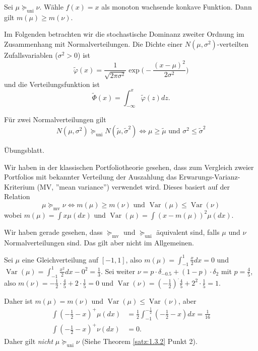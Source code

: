 \documentclass[a4paper,twoside,DIV15,BCOR12mm]{scrbook}
\newcommand{\unisucceq}{\succeq_{\text{uni}}}
\newcommand{\mvsucceq}{\succeq_{\text{mv}}}
\DeclareMathOperator{\Var}{Var}
\begin{document}
\begin{bemerkung}
Sei $\mu \unisucceq \nu$. Wähle $f(x) = x$ als monoton wachsende konkave Funktion. Dann gilt \mbox{$m(\mu) \ge m(\nu)$}.
\end{bemerkung}

Im Folgenden betrachten wir die stochastische Dominanz zweiter Ordnung im Zusammenhang mit Normalverteilungen. Die Dichte einer $N(\mu,\sigma^2)$-verteilten Zufallsvariablen ($\sigma^2>0$) ist
\[
\tilde\varphi(x) = \frac1{\sqrt{2\pi\sigma^2}} \exp\Big(-\frac{(x-\mu)^2}{2\sigma^2}\Big)
\]
und die Verteilungsfunktion ist
\[
\tilde\Phi(x) = \int_{-\infty}^x \tilde\varphi(z) dz.
\]

\begin{satz}
Für zwei Normalverteilungen gilt
\[
N(\mu,\sigma^2) \unisucceq N(\tilde\mu,\tilde\sigma^2) \iff \mu\ge \tilde\mu \text{ und } \sigma^2 \le \tilde\sigma^2
\]
\end{satz}

\begin{beweis}
Übungsblatt.
\end{beweis}

Wir haben in der klassischen Portfoliotheorie gesehen, dass zum Vergleich zweier Portfolios mit bekannter Verteilung der Auszahlung das Erwarungs-Varianz-Kriterium (MV, ”mean variance”) verwendet wird. Dieses basiert auf der Relation
\[
\mu \mvsucceq \nu \iff m(\mu) \ge m(\nu) \text{ und } \Var(\mu) \le \Var(\nu)
\]
wobei $m(\mu) = \int x \mu(dx)$ und $\Var(\mu) = \int (x-m(\mu))^2 \mu(dx)$.

Wir haben gerade gesehen, dass $\mvsucceq$ und $\unisucceq$ äquivalent sind, falls $\mu$ und $\nu$ Normalverteilungen sind. Das gilt aber nicht im Allgemeinen.

\begin{beispiel}
Sei $\mu$ eine Gleichverteilung auf $[-1,1]$, also $m(\mu) = \int_{-1}^1 \frac x2 dx = 0$ und \mbox{$\Var(\mu) = \int_{-1}^{1} \frac{x^2}2 dx - 0^2 = \frac 13$}.
Sei weiter $\nu = p \cdot \delta_{-0.5} + (1-p)\cdot \delta_{2}$ mit $p=\frac45$, also $m(\nu) = -\frac 12 \cdot \frac 45 + 2 \cdot \frac 1 5 = 0$ und $\Var(\nu) = (-\frac 12)^ \cdot \frac 45 + 2^2\cdot \frac 15 = 1$.

Daher ist $m(\mu)=m(\nu)$ und $\Var(\mu) \le \Var(\nu)$, aber 
\begin{align*}
\int (-\frac 12 - x)^+\mu(dx) &= \frac 12 \int_{-1}^{-\frac12} (-\frac 12 - x)dx = \frac 1{16} \\
\int (-\frac 12 - x)^+\nu(dx) &= 0.
\end{align*}
Daher gilt \emph{nicht} $\mu\unisucceq\nu$ (Siehe Theorem \ref{satz:1.3.2} Punkt 2).
\end{beispiel}
\end{document}
